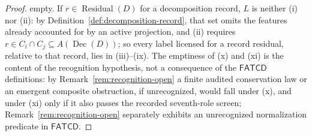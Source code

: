 \documentclass[11pt]{article}
\theoremstyle{definition}
\newcommand{\FATCD}{\ensuremath{\mathsf{FATCD}}}
\newcommand{\Dec}[1]{\ensuremath{\operatorname{Dec}\!\left(#1\right)}}
\newcommand{\Residual}[1]{\ensuremath{\operatorname{Residual}\!\left(#1\right)}}
\begin{document}
\begin{proof}
empty. If \(r\in\Residual{D}\) for a decomposition record, \(L\) is neither (i)
nor (ii): by Definition~\ref{def:decomposition-record}, that set omits the
features already accounted for by an active projection, and (ii) requires
\(r\in C_i\cap C_j\subseteq A(\Dec{D})\); so every label licensed for a record
residual, relative to that record, lies in (iii)--(ix). The
emptiness of (x) and (xi) is the content of the recognition hypothesis, not a
consequence of the \FATCD{} definitions: by Remark~\ref{rem:recognition-open}
a finite audited conservation law or an emergent composite obstruction, if
unrecognized, would fall under (x), and under (xi) only if it also passes the recorded
seventh-role screen; Remark~\ref{rem:recognition-open} separately
exhibits an unrecognized normalization predicate in \FATCD{}.
\end{proof}
\end{document}
